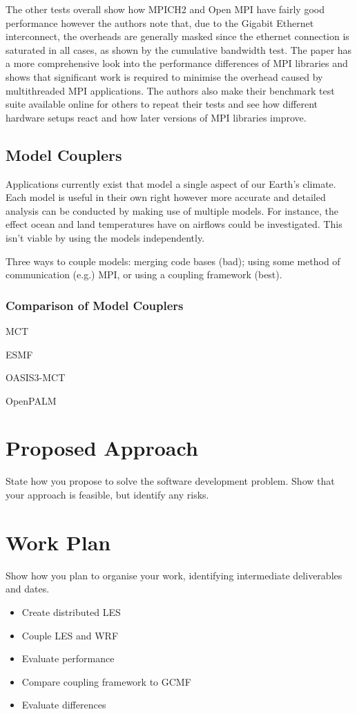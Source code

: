 \documentclass{acm_proc_article-sp}
\renewcommand{\_}{\underscore\hspace{0pt}}
\begin{document}
The other tests overall show how MPICH2 and Open MPI have fairly good
performance however the authors note that, due to the Gigabit Ethernet
interconnect, the overheads are generally masked since the ethernet connection
is saturated in all cases, as shown by the cumulative bandwidth test. The paper
has a more comprehensive look into the performance differences of MPI libraries
and shows that significant work is required to minimise the overhead caused by
multithreaded MPI applications. The authors also make their benchmark test suite
available online for others to repeat their tests and see how different hardware
setups react and how later versions of MPI libraries improve.

\subsection*{Model Couplers}

Applications currently exist that model a single aspect of our Earth's climate.
Each model is useful in their own right however more accurate and detailed
analysis can be conducted by making use of multiple models. For instance, the
effect ocean and land temperatures have on airflows could be investigated. This
isn't viable by using the models independently.

Three ways to couple models: merging code bases (bad); using some method of
communication (e.g.) MPI, or using a coupling framework (best).

\subsubsection*{Comparison of Model Couplers}

MCT

ESMF

OASIS3-MCT

OpenPALM

\section*{Proposed Approach}

State how you propose to solve the software development problem. Show that your
approach is feasible, but identify any risks.

\section*{Work Plan}

Show how you plan to organise your work, identifying intermediate deliverables
and dates.

\begin{itemize}
	\item Create distributed LES
	\item Couple LES and WRF
	\item Evaluate performance
	\item Compare coupling framework to GCMF
	\item Evaluate differences
\end{itemize}



\end{document}
